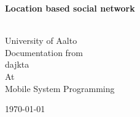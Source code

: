 \documentclass[
		11pt,				 %
		a4paper,			%
		oneside,			%
		titlepage,		%
		headsepline,	%
		DIV11,				%
		abstracton,	 %
		BCOR0cm,			%
		pointlessnumbers, %
		bibtotoc			%
]{scrreprt}			%
\begin{document}
	\thispagestyle{empty}
	
	\begin{center}
		\begin{LARGE}\bfseries Location based social network\end{LARGE}\\
		[2cm]
		\Large{University of Aalto}\\
		[1cm]
		\large{Documentation from }\\
		\Large{dajkta}\\
		[1cm]
		\large{At}\\ \Large{Mobile System Programming}\\
		[1cm]
	\end{center}

	

	\begin{center}\today \end{center}%

	\newpage
	
	
	\tableofcontents


	\newpage
	
	
	
	
	

	

	

	

	
	\nocite{*}
%	
	
	
	\appendix
\end{document}
